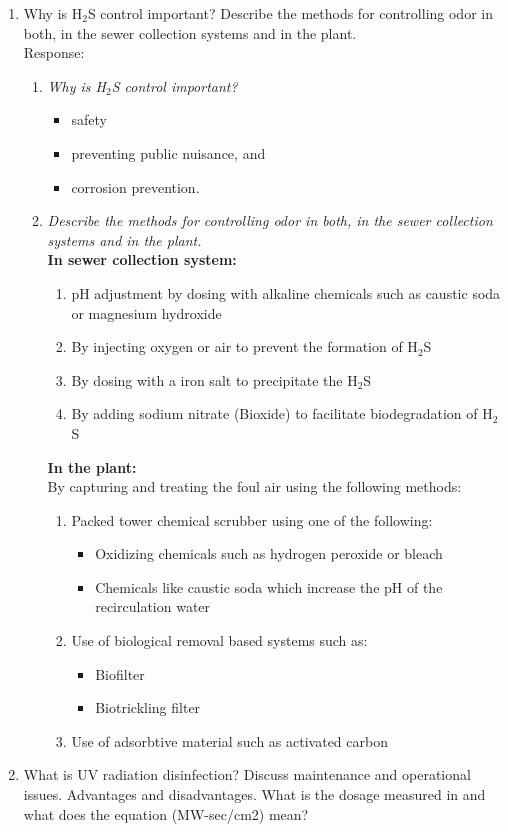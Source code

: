 \begin{enumerate}
\item Why is H$_2$S control important?  Describe the methods for controlling odor in both, in the sewer collection systems and in the plant.\\
Response:\\
\begin{enumerate}[label=\alph*]
\item \textit{Why is H$_2$S control important?}
\begin{itemize}
\item safety
\item preventing public nuisance, and
\item  corrosion prevention.\\
\end{itemize}
\item \textit{Describe the methods for controlling odor in both, in the sewer collection systems and in the plant.}\\
\textbf{In sewer collection system:}
\begin{enumerate}
\item pH adjustment by dosing with alkaline chemicals such as caustic soda or magnesium hydroxide
\item By injecting oxygen or air to prevent the formation of H$_2$S
\item By dosing with a iron salt to precipitate the H$_2$S 
\item By adding sodium nitrate (Bioxide) to facilitate biodegradation of H$_2$S
\end{enumerate}
\textbf{In the plant:}\\
By capturing and treating the foul air using the following methods:
\begin{enumerate}
\item Packed tower chemical scrubber using one of the following:
\begin{itemize}
\item Oxidizing chemicals such as hydrogen peroxide or bleach
\item Chemicals like caustic soda which increase the pH of the recirculation water
\end{itemize}
\item Use of biological removal based systems such as:
\begin{itemize}
\item Biofilter
\item Biotrickling filter
\end{itemize}
\item Use of adsorbtive material such as activated carbon
\end{enumerate}
\end{enumerate}


\item What is UV radiation disinfection?  Discuss maintenance and operational issues.  Advantages and disadvantages.  What is the dosage measured in and what does the equation (MW-sec/cm2) mean?

\end{enumerate}








